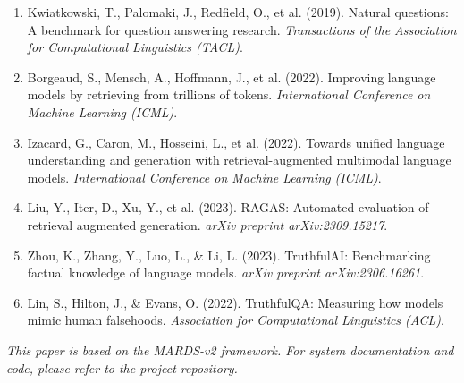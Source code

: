 \documentclass[12pt,a4paper]{article}
\begin{document}
\begin{enumerate}
    \item Kwiatkowski, T., Palomaki, J., Redfield, O., et al. (2019). Natural questions: A benchmark for question answering research. \textit{Transactions of the Association for Computational Linguistics (TACL)}.

    \item Borgeaud, S., Mensch, A., Hoffmann, J., et al. (2022). Improving language models by retrieving from trillions of tokens. \textit{International Conference on Machine Learning (ICML)}.

    \item Izacard, G., Caron, M., Hosseini, L., et al. (2022). Towards unified language understanding and generation with retrieval-augmented multimodal language models. \textit{International Conference on Machine Learning (ICML)}.

    \item Liu, Y., Iter, D., Xu, Y., et al. (2023). RAGAS: Automated evaluation of retrieval augmented generation. \textit{arXiv preprint arXiv:2309.15217}.

    \item Zhou, K., Zhang, Y., Luo, L., \& Li, L. (2023). TruthfulAI: Benchmarking factual knowledge of language models. \textit{arXiv preprint arXiv:2306.16261}.

    \item Lin, S., Hilton, J., \& Evans, O. (2022). TruthfulQA: Measuring how models mimic human falsehoods. \textit{Association for Computational Linguistics (ACL)}.
\end{enumerate}

\medskip
\textit{This paper is based on the MARDS-v2 framework. For system documentation and code, please refer to the project repository.}
\end{document}
